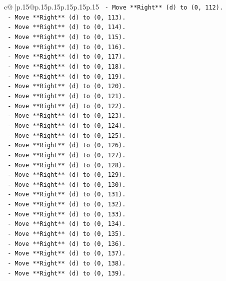 \documentclass{article}
\begin{document}
{\begin{supertabular}{c@{$\;$}|p{.15\linewidth}@{}p{.15\linewidth}p{.15\linewidth}p{.15\linewidth}p{.15\linewidth}p{.15\linewidth}}
{{{\texttt{        {-} Move **Right** (d) to (0, 112).} \\
\texttt{        {-} Move **Right** (d) to (0, 113).} \\
\texttt{        {-} Move **Right** (d) to (0, 114).} \\
\texttt{        {-} Move **Right** (d) to (0, 115).} \\
\texttt{        {-} Move **Right** (d) to (0, 116).} \\
\texttt{        {-} Move **Right** (d) to (0, 117).} \\
\texttt{        {-} Move **Right** (d) to (0, 118).} \\
\texttt{        {-} Move **Right** (d) to (0, 119).} \\
\texttt{        {-} Move **Right** (d) to (0, 120).} \\
\texttt{        {-} Move **Right** (d) to (0, 121).} \\
\texttt{        {-} Move **Right** (d) to (0, 122).} \\
\texttt{        {-} Move **Right** (d) to (0, 123).} \\
\texttt{        {-} Move **Right** (d) to (0, 124).} \\
\texttt{        {-} Move **Right** (d) to (0, 125).} \\
\texttt{        {-} Move **Right** (d) to (0, 126).} \\
\texttt{        {-} Move **Right** (d) to (0, 127).} \\
\texttt{        {-} Move **Right** (d) to (0, 128).} \\
\texttt{        {-} Move **Right** (d) to (0, 129).} \\
\texttt{        {-} Move **Right** (d) to (0, 130).} \\
\texttt{        {-} Move **Right** (d) to (0, 131).} \\
\texttt{        {-} Move **Right** (d) to (0, 132).} \\
\texttt{        {-} Move **Right** (d) to (0, 133).} \\
\texttt{        {-} Move **Right** (d) to (0, 134).} \\
\texttt{        {-} Move **Right** (d) to (0, 135).} \\
\texttt{        {-} Move **Right** (d) to (0, 136).} \\
\texttt{        {-} Move **Right** (d) to (0, 137).} \\
\texttt{        {-} Move **Right** (d) to (0, 138).} \\
\texttt{        {-} Move **Right** (d) to (0, 139).} \\
}}}
\end{supertabular}}
\end{document}
